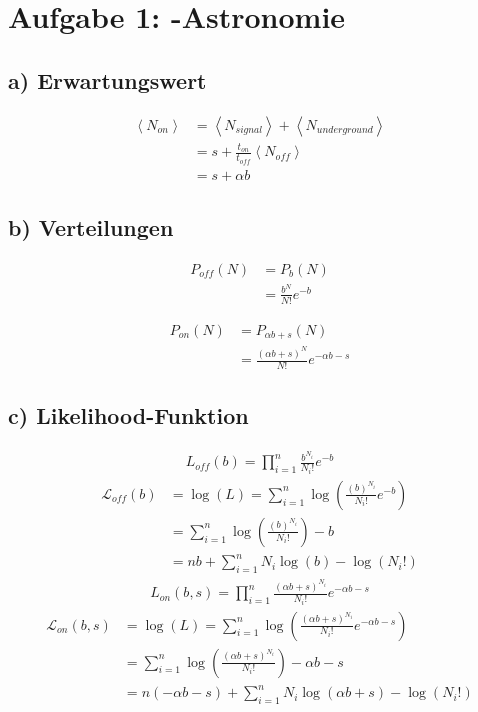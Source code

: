 \section*{Aufgabe 1: \gamma-Astronomie}
\label{sec:Aufgabe1}
\subsection*{a) Erwartungswert}
\label{sub:Erwartungswert}
\begin{align}
    \left<N_{on}\right> &=\left<N_{signal}\right>+\left<N_{underground}\right>\nonumber\\
                        &=s + \frac{t_{on}}{t_{off}} \left<N_{off}\right>\nonumber\\
                        &=s+\alpha b
\end{align}

\subsection*{b) Verteilungen}
\label{sub:Verteilungen}
\begin{align}
    P_{off}(N)&=P_{b}(N)\nonumber\\
              &=\frac{b^N}{N!}e^{-b}
\end{align}

\begin{align}
    P_{on}(N)&=P_{\alpha b+s}(N)\nonumber\\
                       &=\frac{(\alpha b+s)^N}{N!}e^{-\alpha b-s}
\end{align}

\subsection*{c) Likelihood-Funktion}
\label{sub:Likelihood-Funktion}
\begin{align}
    L_{off} (b)=\prod_{i=1}^n \frac{b^{N_i}}{{N_i}!}e^{-b}
\end{align}
\begin{align}
    \mathcal{L}_{off}(b)&=\log(L)=\sum_{i=1}^n \log\left(\frac{(b)^{N_i}}{{N_i}!}e^{-b}\right)\nonumber\\
                    &=\sum_{i=1}^n \log\left(\frac{(b)^{N_i}}{{N_i}!}\right)-b\nonumber\\
                    &=n b+ \sum_{i=1}^n N_i\log\left(b\right) -\log(N_i!)
\end{align}
\begin{align}
    L_{on} (b,s)=\prod_{i=1}^n \frac{(\alpha b+s)^{N_i}}{{N_i}!}e^{-\alpha b-s}
\end{align}
\begin{align}
    \mathcal{L}_{on}(b,s)&=\log(L)=\sum_{i=1}^n \log\left(\frac{(\alpha b+s)^{N_i}}{{N_i}!}e^{-\alpha b-s}\right)\nonumber\\
                    &=\sum_{i=1}^n \log\left(\frac{(\alpha b+s)^{N_i}}{{N_i}!}\right)-\alpha b-s\nonumber\\
                    &=n (-\alpha b-s)+ \sum_{i=1}^n N_i\log\left(\alpha b+s\right) -\log(N_i!)
\end{align}

